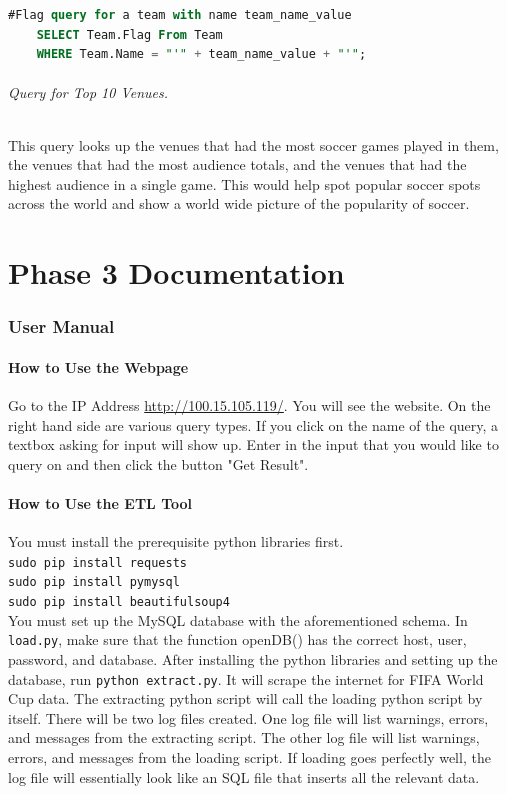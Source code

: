 \documentclass{article}
\begin{document}
\begin{lstlisting}[language=SQL]
	#Flag query for a team with name team_name_value
	SELECT Team.Flag From Team 
	WHERE Team.Name = "'" + team_name_value + "'";
\end{lstlisting}

\paragraph{Query for Top 10 Venues.}
This query looks up the venues that had the most soccer games played in them, the venues that had the most audience totals, and the venues that had the highest audience in a single game. This would help spot popular soccer spots across the world and show a world wide picture of the popularity of soccer.


\part{Phase 3 Documentation}
\section{User Manual}

\subsection{How to Use the Webpage}
Go to the IP Address \url{http://100.15.105.119/}. You will see the website.
On the right hand side are various query types. If you click on the name of the query, a textbox asking for input will show up. Enter in the input that you would like to query on and then click the button "Get Result".

\subsection{How to Use the ETL Tool}
You must install the prerequisite python libraries first.
\\
\texttt{sudo pip install requests}
\\
\texttt{sudo pip install pymysql}
\\
\texttt{sudo pip install beautifulsoup4}
\\
You must set up the MySQL database with the aforementioned schema.
In \texttt{load.py}, make sure that the function openDB() has the correct 
host, user, password, and database. 
After installing the python libraries and setting up the database, run \texttt{python extract.py}. It will scrape the internet for FIFA World Cup data. The extracting python script will call the loading python script by itself. There will be two log files created. One log file will list warnings, errors, and messages from the extracting script. The other log file will list
warnings, errors, and messages from the loading script. If loading goes perfectly well, the log file will essentially look like an SQL file that inserts all the relevant data.
\end{document}
